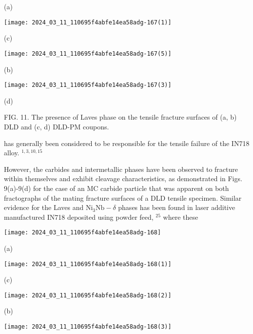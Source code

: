 \documentclass[10pt]{article}
\begin{document}
(a)

\begin{center}
\texttt{[image: 2024\_03\_11\_110695f4abfe14ea58adg-167(1)]}
\end{center}

(c)

\begin{center}
\texttt{[image: 2024\_03\_11\_110695f4abfe14ea58adg-167(5)]}
\end{center}

(b)

\begin{center}
\texttt{[image: 2024\_03\_11\_110695f4abfe14ea58adg-167(3)]}
\end{center}

(d)

FIG. 11. The presence of Laves phase on the tensile fracture surfaces of (a, b) DLD and (c, d) DLD-PM coupons.

has generally been considered to be responsible for the tensile failure of the IN718 alloy. ${ }^{1,3,10,15}$

However, the carbides and intermetallic phases have been observed to fracture within themselves and exhibit cleavage characteristics, as demonstrated in Figs. 9(a)-9(d) for the case of an $\mathrm{MC}$ carbide particle that was apparent on both fractographs of the mating fracture surfaces of a DLD tensile specimen. Similar evidence for the Laves and $\mathrm{Ni}_{3} \mathrm{Nb}-\delta$ phases has been found in laser additive manufactured IN718 deposited using powder feed, ${ }^{25}$ where these

\begin{center}
\texttt{[image: 2024\_03\_11\_110695f4abfe14ea58adg-168]}
\end{center}

(a)

\begin{center}
\texttt{[image: 2024\_03\_11\_110695f4abfe14ea58adg-168(1)]}
\end{center}

(c)

\begin{center}
\texttt{[image: 2024\_03\_11\_110695f4abfe14ea58adg-168(2)]}
\end{center}

(b)

\begin{center}
\texttt{[image: 2024\_03\_11\_110695f4abfe14ea58adg-168(3)]}
\end{center}
\end{document}
